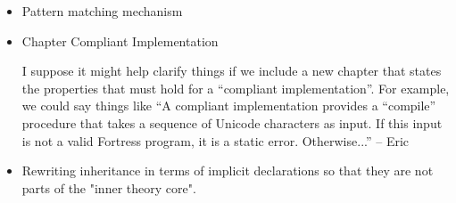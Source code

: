 \begin{itemize}
\item Pattern matching mechanism

\item Chapter Compliant Implementation

I suppose it might help clarify things if we include a new chapter  that
states the properties that must hold for a ``compliant  implementation''.
For example, we could say things like ``A compliant  implementation
provides a ``compile'' procedure that takes a sequence  of Unicode
characters as input.  If this input is not a valid Fortress  program, it is
a static error.  Otherwise...'' -- Eric

\item Rewriting inheritance in terms of implicit declarations so that they
  are not parts of the "inner theory core".


\end{itemize}
